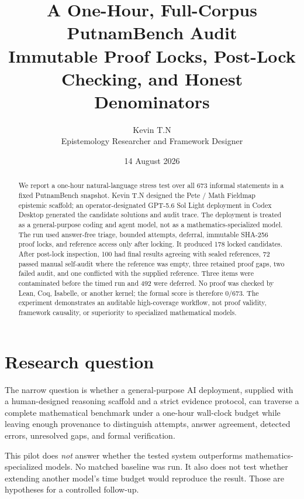 \documentclass[10pt]{article}
\title{\textbf{A One-Hour, Full-Corpus PutnamBench Audit}\\[3pt]
\large Immutable Proof Locks, Post-Lock Checking, and Honest Denominators}
\author{Kevin T.N\\\small Epistemology Researcher and Framework Designer}
\date{14 August 2026}
\begin{document}
\maketitle

\begin{abstract}
We report a one-hour natural-language stress test over all 673 informal statements in a fixed PutnamBench snapshot. Kevin T.N designed the Pete / Math Fieldmap epistemic scaffold; an operator-designated GPT-5.6 Sol Light deployment in Codex Desktop generated the candidate solutions and audit trace. The deployment is treated as a general-purpose coding and agent model, not as a mathematics-specialized model. The run used answer-free triage, bounded attempts, deferral, immutable SHA-256 proof locks, and reference access only after locking. It produced 178 locked candidates. After post-lock inspection, 100 had final results agreeing with sealed references, 72 passed manual self-audit where the reference was empty, three retained proof gaps, two failed audit, and one conflicted with the supplied reference. Three items were contaminated before the timed run and 492 were deferred. No proof was checked by Lean, Coq, Isabelle, or another kernel; the formal score is therefore 0/673. The experiment demonstrates an auditable high-coverage workflow, not proof validity, framework causality, or superiority to specialized mathematical models.
\end{abstract}

\section{Research question}
The narrow question is whether a general-purpose AI deployment, supplied with a human-designed reasoning scaffold and a strict evidence protocol, can traverse a complete mathematical benchmark under a one-hour wall-clock budget while leaving enough provenance to distinguish attempts, answer agreement, detected errors, unresolved gaps, and formal verification.

This pilot does \emph{not} answer whether the tested system outperforms mathematics-specialized models. No matched baseline was run. It also does not test whether extending another model's time budget would reproduce the result. Those are hypotheses for a controlled follow-up.
\end{document}
